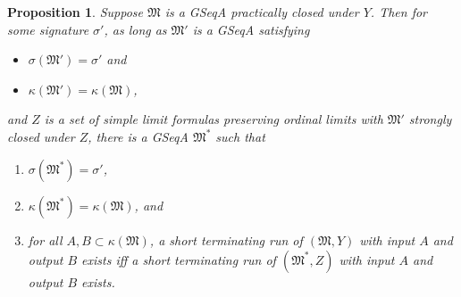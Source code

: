 \documentclass[12pt, twoside]{memoir}
\numberwithin{equation}{section}
\newtheorem{prop}[thm]{Proposition}
\theoremstyle{definition}
\theoremstyle{remark}
\theoremstyle{definition}
\theoremstyle{definition}
\theoremstyle{definition}
\theoremstyle{remark}
\begin{document}
\begin{prop}\label{prop239}
Suppose $\mathfrak{M}$ is a GSeqA practically closed under $Y$. Then for some signature $\sigma'$, as long as $\mathfrak{M}'$ is a GSeqA satisfying 
\begin{itemize}
    \item $\sigma(\mathfrak{M}') = \sigma'$ and
    \item $\kappa(\mathfrak{M}') = \kappa(\mathfrak{M})$,
\end{itemize}
and $Z$ is a set of simple limit formulas preserving ordinal limits with $\mathfrak{M}'$ strongly closed under $Z$, there is a GSeqA $\mathfrak{M}^*$ such that
\begin{enumerate}[label=(\alph*)]
    \item\label{2391} $\sigma(\mathfrak{M}^*) = \sigma'$,
    \item\label{2392} $\kappa(\mathfrak{M}^*) = \kappa(\mathfrak{M})$, and
    \item\label{2393} for all $A, B \subset \kappa(\mathfrak{M})$, a short terminating run of $(\mathfrak{M}, Y)$ with input $A$ and output $B$ exists iff a short terminating run of $(\mathfrak{M}^*, Z)$ with input $A$ and output $B$ exists.
\end{enumerate}
\end{prop}
\end{document}
